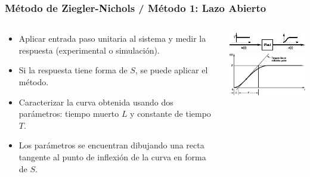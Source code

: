 \documentclass[aspectratio=169]{beamer}
\theoremstyle{definition}
\theoremstyle{plain}
\theoremstyle{remark}
\begin{document}
\begin{frame}[<+->]\frametitle{Método de Ziegler-Nichols / Método 1: Lazo Abierto}
\small
\vspace*{-2mm}
\begin{columns}
\begin{column}{0.5\textwidth}
\begin{itemize}
	\item Aplicar entrada paso unitaria al sistema y medir la respuesta (experimental o simulación).
	\item Si la respuesta tiene forma de $S$, se puede aplicar el método.
	\item Caracterizar la curva obtenida usando dos parámetros: tiempo muerto $L$ y constante de tiempo $T$.
	\item Los parámetros se encuentran dibujando una recta tangente al punto de inflexión de la curva en forma de $S$.
\end{itemize}
\end{column}	
\begin{column}{0.5\textwidth}
\includegraphics[width=6.5cm]{images/zieglerNichols1a.eps}\\
\vspace*{5mm}
\includegraphics[width=6.5cm]{images/zieglerNichols1b.eps}
\end{column}	
\end{columns}
\end{frame}
\end{document}
